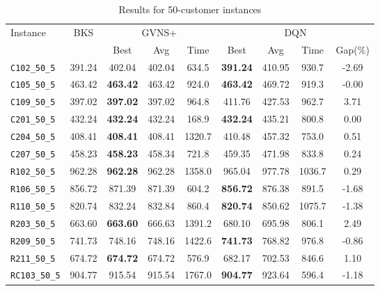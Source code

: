 \begin{table}[ht]
\centering
\small
\setlength{\tabcolsep}{5pt}
\caption{Results for 50-customer instances}
\vspace{4mm}
\begin{adjustbox}{width=\textwidth}
\begin{tabular}{l c c c c @{\hspace{8pt}} c c c c @{\hspace{8pt}}}
\toprule
\multirow{2}{*}{Instance} & \multirow{2}{*}{BKS} & \multicolumn{3}{c}{GVNS+} & \multicolumn{4}{c}{DQN} \\
\cmidrule(lr){3-5} \cmidrule(lr){6-9}
 &  & Best & Avg & Time & Best & Avg & Time & Gap(\%) \\
\midrule
\texttt{C102\_50\_5} & 391.24 & 402.04 & 402.04 & 634.5 & \textbf{391.24} & 410.95 & 930.7 & -2.69 \\
\texttt{C105\_50\_5} & 463.42 & \textbf{463.42} & 463.42 & 924.0 & \textbf{463.42} & 469.72 & 919.3 & -0.00 \\
\texttt{C109\_50\_5} & 397.02 & \textbf{397.02} & 397.02 & 964.8 & 411.76 & 427.53 & 962.7 & 3.71 \\
\texttt{C201\_50\_5} & 432.24 & \textbf{432.24} & 432.24 & 168.9 & \textbf{432.24} & 435.21 & 800.8 & 0.00 \\
\texttt{C204\_50\_5} & 408.41 & \textbf{408.41} & 408.41 & 1320.7 & 410.48 & 457.32 & 753.0 & 0.51 \\
\texttt{C207\_50\_5} & 458.23 & \textbf{458.23} & 458.34 & 721.8 & 459.35 & 471.98 & 833.8 & 0.24 \\
\texttt{R102\_50\_5} & 962.28 & \textbf{962.28} & 962.28 & 1358.0 & 965.04 & 977.78 & 1036.7 & 0.29 \\
\texttt{R106\_50\_5} & 856.72 & 871.39 & 871.39 & 604.2 & \textbf{856.72} & 876.38 & 891.5 & -1.68 \\
\texttt{R110\_50\_5} & 820.74 & 832.24 & 832.84 & 860.4 & \textbf{820.74} & 850.62 & 1075.7 & -1.38 \\
\texttt{R203\_50\_5} & 663.60 & \textbf{663.60} & 666.63 & 1391.2 & 680.10 & 695.98 & 806.1 & 2.49 \\
\texttt{R209\_50\_5} & 741.73 & 748.16 & 748.16 & 1422.6 & \textbf{741.73} & 768.82 & 976.8 & -0.86 \\
\texttt{R211\_50\_5} & 674.72 & \textbf{674.72} & 674.72 & 576.9 & 682.17 & 702.53 & 846.6 & 1.10 \\
\texttt{RC103\_50\_5} & 904.77 & 915.54 & 915.54 & 1767.0 & \textbf{904.77} & 923.64 & 596.4 & -1.18 \\

\end{tabular}
\end{adjustbox}
\end{table}
